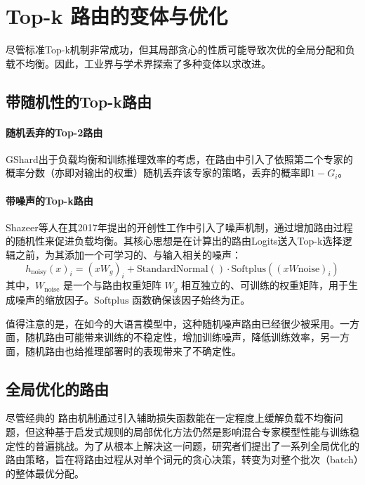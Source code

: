 \section{Top-k 路由的变体与优化}
尽管标准Top-k机制非常成功，但其局部贪心的性质可能导致次优的全局分配和负载不均衡。因此，工业界与学术界探索了多种变体以求改进。

\subsection{带随机性的Top-k路由} 
\paragraph{随机丢弃的Top-2路由} GShard\cite{Lepikhin2020GShardSG}出于负载均衡和训练推理效率的考虑，在路由中引入了依照第二个专家的概率分数（亦即对输出的权重）随机丢弃该专家的策略，丢弃的概率即$1 - G_i$。

\paragraph{带噪声的Top-k路由} 
Shazeer等人在其2017年提出的开创性工作\cite{Shazeer2017OutrageouslyLN}中引入了噪声机制，通过增加路由过程的随机性来促进负载均衡。其核心思想是在计算出的路由Logits送入Top-k选择逻辑之前，为其添加一个可学习的、与输入相关的噪声： 
\begin{equation}
h_{\text{noisy}}(x)_i = (x W_g)_i + \text{StandardNormal}() \cdot \text{Softplus}((x W{\text{noise}})_i)
\end{equation}
其中，$W_{\text{noise}}$ 是一个与路由权重矩阵 $W_g$ 相互独立的、可训练的权重矩阵，用于生成噪声的缩放因子。$\text{Softplus}$ 函数确保该因子始终为正。

值得注意的是，在如今的大语言模型中，这种随机噪声路由已经很少被采用。一方面，随机路由可能带来训练的不稳定性，增加训练噪声，降低训练效率，另一方面，随机路由也给推理部署时的表现带来了不确定性。

\subsection{全局优化的路由}
尽管经典的  路由机制通过引入辅助损失函数能在一定程度上缓解负载不均衡问题，但这种基于启发式规则的局部优化方法仍然是影响混合专家模型性能与训练稳定性的普遍挑战。为了从根本上解决这一问题，研究者们提出了一系列全局优化的路由策略，旨在将路由过程从对单个词元的贪心决策，转变为对整个批次（batch）的整体最优分配。

